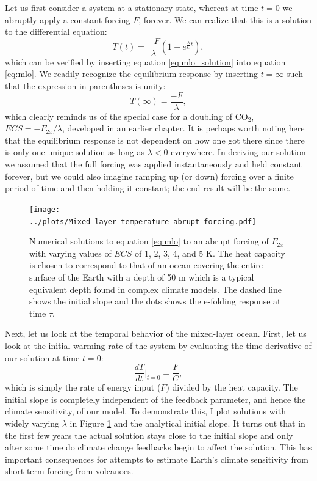 \documentclass[12pt]{book}
\begin{document}
Let us first consider a system at a stationary state, whereat at time $t=0$ we abruptly apply a constant forcing $F$, forever. We can realize that this is a solution to the differential equation:
\begin{equation}
T(t) = \frac{-F}{\lambda}\left(1-e^{\frac{\lambda}{C}t}\right),
\label{eq:mlo_solution}
\end{equation}
which can be verified by inserting equation \ref{eq:mlo_solution} into equation \ref{eq:mlo}. We readily recognize the equilibrium response by inserting $t=\infty$ such that the expression in parentheses is unity:
\begin{equation}
T(\infty)=\frac{-F}{\lambda},
\label{eq:mlo_equilibrium}
\end{equation}
which clearly reminds us of the special case for a doubling of CO$_2$, $ECS=-F_{2x}/\lambda$, developed in an earlier chapter. It is perhaps worth noting here that the equilibrium response is not dependent on how one got there since there is only one unique solution as long as $\lambda < 0$ everywhere. In deriving our solution we assumed that the full forcing was applied instantaneously and held constant forever, but we could also imagine ramping up (or down) forcing over a finite period of time and then holding it constant; the end result will be the same.

\begin{figure}
\begin{center}
\texttt{[image: ../plots/Mixed\_layer\_temperature\_abrupt\_forcing.pdf]}
\end{center}
\caption{ Numerical solutions to equation \ref{eq:mlo} to an abrupt forcing of $F_{2x}$ with varying values of $ECS$ of 1, 2, 3, 4, and 5 K. The heat capacity is chosen to correspond to that of an ocean covering the entire surface of the Earth with a depth of 50 m which is a typical equivalent depth found in complex climate models. The dashed line shows the initial slope and the dots shows the e-folding response at time $\tau$. } 
\label{fig:mlo_plot}
\end{figure}

Next, let us look at the temporal behavior of the mixed-layer ocean. First, let us look at the initial warming rate of the system by evaluating the time-derivative of our solution at time $t=0$:
$$\frac{dT}{dt}\Bigr|_{t=0} = \frac{F}{C},$$
which is simply the rate of energy input ($F$) divided by the heat capacity. The initial slope is completely independent of the feedback parameter, and hence the climate sensitivity, of our model. To demonstrate this, I plot solutions with widely varying $\lambda$ in Figure \ref{fig:mlo_plot} and the analytical initial slope. It turns out that in the first few years the actual solution stays close to the initial slope and only after some time do climate change feedbacks begin to affect the solution. This has important consequences for attempts to estimate Earth's climate sensitivity from short term forcing from volcanoes.
\end{document}
